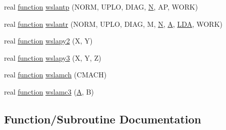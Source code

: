 \begin{DoxyCompactItemize}
\item 
real \hyperlink{afunc_8m_a7b5e596df91eadea6c537c0825e894a7}{function} \hyperlink{wrap__dummy__accelerate_8f_a4f6e5037a60047036c566923f08b6da4}{wslantp} (N\+O\+R\+M, U\+P\+L\+O, D\+I\+A\+G, \hyperlink{polmisc_8c_a0240ac851181b84ac374872dc5434ee4}{N}, A\+P, W\+O\+R\+K)
\item 
real \hyperlink{afunc_8m_a7b5e596df91eadea6c537c0825e894a7}{function} \hyperlink{wrap__dummy__accelerate_8f_af383216d79b77468881c27baabd527ba}{wslantr} (N\+O\+R\+M, U\+P\+L\+O, D\+I\+A\+G, M, \hyperlink{polmisc_8c_a0240ac851181b84ac374872dc5434ee4}{N}, \hyperlink{classA}{A}, \hyperlink{example__user_8c_ae946da542ce0db94dced19b2ecefd1aa}{L\+D\+A}, W\+O\+R\+K)
\item 
real \hyperlink{afunc_8m_a7b5e596df91eadea6c537c0825e894a7}{function} \hyperlink{wrap__dummy__accelerate_8f_a0f8b3042cef97dfca3eacf7fff1c4d60}{wslapy2} (X, Y)
\item 
real \hyperlink{afunc_8m_a7b5e596df91eadea6c537c0825e894a7}{function} \hyperlink{wrap__dummy__accelerate_8f_aac2d305d917fb78b9fac302a36c3a9a6}{wslapy3} (X, Y, Z)
\item 
real \hyperlink{afunc_8m_a7b5e596df91eadea6c537c0825e894a7}{function} \hyperlink{wrap__dummy__accelerate_8f_aef6f35188b919602d66a36dfb0c733e8}{wslamch} (C\+M\+A\+C\+H)
\item 
real \hyperlink{afunc_8m_a7b5e596df91eadea6c537c0825e894a7}{function} \hyperlink{wrap__dummy__accelerate_8f_a5f5736b21d25a6ab439d1bdd0b6dedee}{wslamc3} (\hyperlink{classA}{A}, B)
\end{DoxyCompactItemize}


\subsection{Function/\+Subroutine Documentation}
\hypertarget{wrap__dummy__accelerate_8f_aa25bbe530381d0d77fd7cb2ae26643a4}{}
